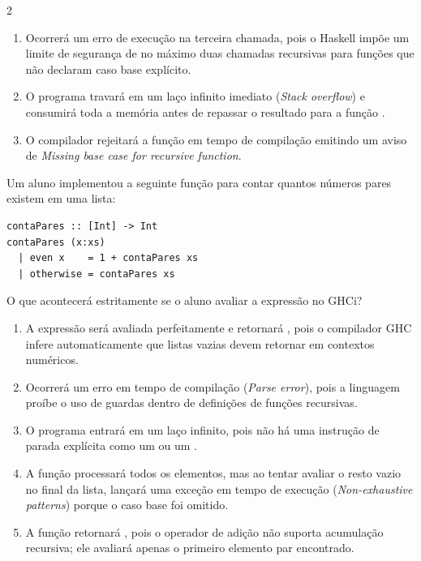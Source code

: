 \documentclass[a4paper,10pt,brazil]{article}
\begin{document}
\begin{multicols}{2}
\begin{enumerate}
  \item Ocorrerá um erro de execução na terceira chamada, pois o Haskell impõe um limite de segurança de no máximo duas chamadas recursivas para funções que não declaram caso base explícito.
  \item O programa travará em um laço infinito imediato (\emph{Stack overflow}) e consumirá toda a memória antes de repassar o resultado para a função .

  \item O compilador rejeitará a função  em tempo de compilação emitindo um aviso de \emph{Missing base case for recursive function}.


\end{enumerate}

Um aluno implementou a seguinte função para contar quantos números pares existem em uma lista:

\begin{verbatim}
contaPares :: [Int] -> Int
contaPares (x:xs)
  | even x    = 1 + contaPares xs
  | otherwise = contaPares xs
\end{verbatim}

O que acontecerá estritamente se o aluno avaliar a expressão  no GHCi?

\begin{enumerate}
  \item A expressão será avaliada perfeitamente e retornará , pois o compilador GHC infere automaticamente que listas vazias devem retornar  em contextos numéricos.

  \item Ocorrerá um erro em tempo de compilação (\emph{Parse error}), pois a linguagem proíbe o uso de guardas dentro de definições de funções recursivas.

  \item O programa entrará em um laço infinito, pois não há uma instrução de parada explícita como um  ou um .

  \item A função processará todos os elementos, mas ao tentar avaliar o resto vazio no final da lista, lançará uma exceção em tempo de execução (\emph{Non-exhaustive patterns}) porque o caso base  foi omitido.

  \item A função retornará , pois o operador de adição não suporta acumulação recursiva; ele avaliará apenas o primeiro elemento par encontrado.



\end{enumerate}
\end{multicols}
\end{document}
